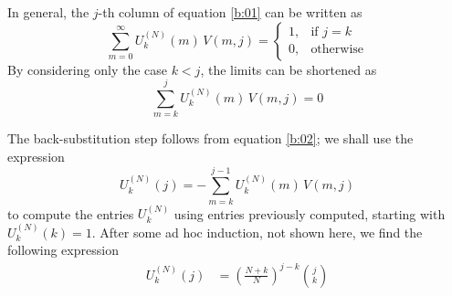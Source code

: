 \documentclass{article}
\newcommand{\ppar}[1]{\left( #1 \right)}
\begin{document}
In general, the $j$-th column of equation \eqref{b:01} can be written as
\begin{equation}
    \sum_{m=0}^\infty {U_k^{(N)}}(m)\, V(m,j)  = 
    \begin{cases}
        1, &\text{if } j=k \\
        0, &\text{otherwise}
    \end{cases}
\end{equation}
By considering only the case $k<j$, the limits can be shortened as
\begin{equation}
    \sum_{m=k}^j {U_k^{(N)}}(m)\, V(m,j)  = 
    0
    \label{b:02}
\end{equation}

The back-substitution step follows from equation \eqref{b:02};
we shall use the expression
\begin{equation}
    {U_k^{(N)}}(j) = 
    -\sum_{m=k}^{j-1} {U_k^{(N)}}(m)\, V(m,j)
\end{equation}
to compute the entries ${U_k^{(N)}}$ using entries previously computed, starting with ${U_k^{(N)}}(k) = 1$.
%
After some ad hoc induction, not shown here, we find the following expression
\begin{align}
U_k^{(N)}(j)
    &=
    \ppar{\frac{N+k}{N}}^{j-k} \binom{j}{k}
    \label{eq:b03}
\end{align}
\end{document}
